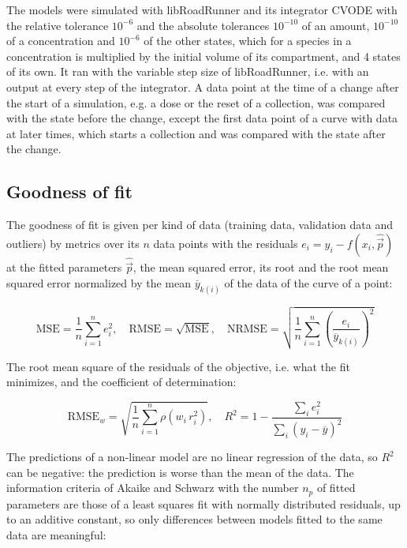 \documentclass{article}
\begin{document}
The models were simulated with libRoadRunner \cite{Welsh2023} and its integrator CVODE \cite{Hindmarsh2005} with the relative tolerance $10^{-6}$ and the absolute tolerances $10^{-10}$ of an amount, $10^{-10}$ of a concentration and $10^{-6}$ of the other states, which for a species in a concentration is multiplied by the initial volume of its compartment, and 4 states of its own. It ran with the variable step size of libRoadRunner, i.e. with an output at every step of the integrator. A data point at the time of a change after the start of a simulation, e.g. a dose or the reset of a collection, was compared with the state before the change, except the first data point of a curve with data at later times, which starts a collection and was compared with the state after the change.

\subsection{Goodness of fit}

The goodness of fit is given per kind of data (training data, validation data and outliers) by metrics over its $n$ data points with the residuals $e_i = y_i - f(x_i, \hat{\vec{p}})$ at the fitted parameters $\hat{\vec{p}}$, the mean squared error, its root and the root mean squared error normalized by the mean $\overline{y}_{k(i)}$ of the data of the curve of a point:

\begin{equation}
\mathrm{MSE} = \frac{1}{n} \sum_{i=1}^{n} e_i^2, \quad \mathrm{RMSE} = \sqrt{\mathrm{MSE}}, \quad \mathrm{NRMSE} = \sqrt{\frac{1}{n} \sum_{i=1}^{n} \left(\frac{e_i}{\overline{y}_{k(i)}}\right)^2}
\end{equation}

The root mean square of the residuals of the objective, i.e. what the fit minimizes, and the coefficient of determination:

\begin{equation}
\mathrm{RMSE}_w = \sqrt{\frac{1}{n} \sum_{i=1}^{n} \rho\left(w_i\, r_i^2\right)}, \quad R^2 = 1 - \frac{\sum_{i} e_i^2}{\sum_{i} \left(y_i - \overline{y}\right)^2}
\end{equation}

The predictions of a non-linear model are no linear regression of the data, so $R^2$ can be negative: the prediction is worse than the mean of the data. The information criteria of Akaike \cite{Akaike1974} and Schwarz \cite{Schwarz1978} with the number $n_p$ of fitted parameters are those of a least squares fit with normally distributed residuals, up to an additive constant, so only differences between models fitted to the same data are meaningful:
\end{document}
